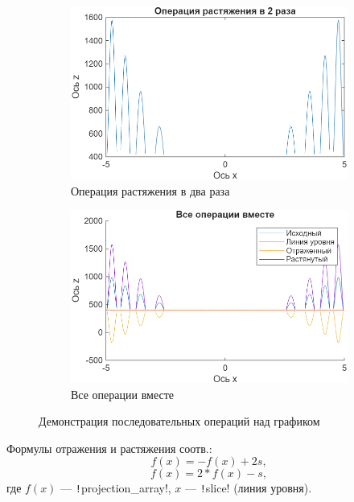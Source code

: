 \begin{figure}[h!]
    \begin{subfigure}{0.48\textwidth}
        \centering
        \includegraphics[width=\linewidth]{figs/ex6_3.png}
        \caption{Операция растяжения в два раза}
        \label{fig:ex6_3}
    \end{subfigure}
    \hfill %
    \begin{subfigure}{0.48\textwidth}
        \centering
        \includegraphics[width=\linewidth]{figs/ex6_4.png}
        \caption{Все операции вместе}
        \label{fig:ex6_4}
    \end{subfigure} %

    \caption{Демонстрация последовательных операций над графиком}
    \label{fig:all_operations}
\end{figure}

Формулы отражения и растяжения соотв.:
$$f(x) = -f(x) + 2s,$$
$$f(x) = 2 * f(x) - s,$$
где $f(x)$ --- \texttt!projection_array!, $x$ --- \texttt!slice! (линия уровня).

